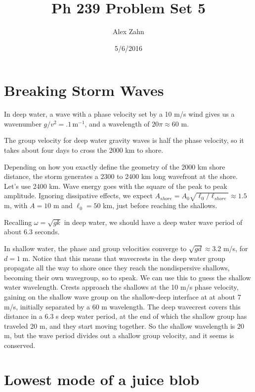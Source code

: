 \documentclass[12pt]{article}
\title{Ph 239 Problem Set 5}
\author{Alex Zahn}
\date{5/6/2016}
\begin{document}
\maketitle

\newcommand{\wmsq}{W/\(\mathrm{m}^2\,\)}
\newcommand{\msq}{\(\mathrm{m}^2\,\)}
\newcommand{\micron}{\(\mu\mathrm{m}\)\,}
\newcommand{\mcb}{\(\mathrm{m}^3\,\)}


\section{Breaking Storm Waves}

In deep water, a wave with a phase velocity set by a 10 m/s wind gives us a wavenumber \(g/v^2 = .1\, \mathrm{m}^{-1}\), and a wavelength of \(20\pi \approx 60\) m.

The group velocity for deep water gravity waves is half the phase velocity, so it takes about four days to cross the 2000 km to shore.

Depending on how you exactly define the geometry of the 2000 km shore distance, the storm generates a 2300 to 2400 km long wavefront at the shore. Let's use 2400 km. Wave energy goes with the square of the peak to peak amplitude. Ignoring dissipative effects, we expect \(A_{shore} = A_0\sqrt{\ell_0/\ell_{shore}}\approx 1.5\) m, with \(A=10\)  m and \(\ell_0 = 50 \) km, just before reaching the shallows.

Recalling \(\omega = \sqrt{gk}\) in deep water, we should have a deep water wave period of about 6.3 seconds.

In shallow water, the phase and group velocities converge to \(\sqrt{gd} \approx 3.2\) m/s, for \(d=1\) m. Notice that this means that wavecrests in the deep water group propagate all the way to shore once they reach the nondispersive shallows, becoming their own wavegroup, so to speak. We can use this to guess the shallow water wavelength. Crests approach the shallows at the 10 m/s phase velocity, gaining on the shallow wave group on the shallow-deep interface at at about 7 m/s, initially separated by a 60 m wavelength. The deep wavecrest covers this distance in a 6.3 s deep water period, at the end of which the shallow group has traveled 20 m, and they start moving together. So the shallow wavelength is 20 m, but the wave period divides out a shallow group velocity, and it seems is conserved.
 
\section{Lowest mode of a juice blob}
\end{document}
